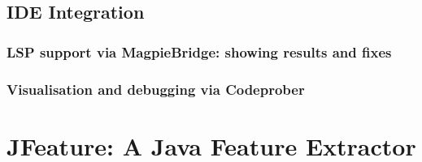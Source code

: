 \subsection{IDE Integration}
\subsubsection{LSP support via MagpieBridge: showing results and fixes}

\subsubsection{Visualisation and debugging via Codeprober}



\section{JFeature: A Java Feature Extractor}







